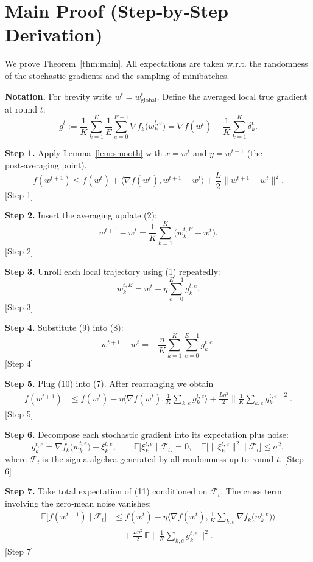 \documentclass{article}
\begin{document}
\section*{Main Proof (Step‑by‑Step Derivation)}
We prove Theorem~\ref{thm:main}. All expectations are taken w.r.t. the randomness of the stochastic gradients and the sampling of minibatches.  

\noindent\textbf{Notation.} For brevity write \(w^{t}=w^{t}_{\text{global}}\). Define the averaged local true gradient at round \(t\):
\[
\bar g^{t}:=\frac1K\sum_{k=1}^{K}\frac1E\sum_{e=0}^{E-1}\nabla f_k\!\big(w_{k}^{t,e}\big)
      =\nabla f(w^{t})+\frac1K\sum_{k=1}^{K}\delta_{k}^{t}. \tag{6}
\]

\noindent\textbf{Step 1.} Apply Lemma~\ref{lem:smooth} with \(x=w^{t}\) and \(y=w^{t+1}\) (the post‑averaging point).  
\[
f(w^{t+1})\le f(w^{t})+\langle\nabla f(w^{t}),w^{t+1}-w^{t}\rangle+\frac{L}{2}\|w^{t+1}-w^{t}\|^{2}. \tag{7}
\] \hfill [Step 1]

\noindent\textbf{Step 2.} Insert the averaging update (2):
\[
w^{t+1}-w^{t}= \frac1K\sum_{k=1}^{K}\big(w_{k}^{t,E}-w^{t}\big). \tag{8}
\] \hfill [Step 2]

\noindent\textbf{Step 3.} Unroll each local trajectory using (1) repeatedly:
\[
w_{k}^{t,E}= w^{t}-\eta\sum_{e=0}^{E-1} g_{k}^{t,e}. \tag{9}
\] \hfill [Step 3]

\noindent\textbf{Step 4.} Substitute (9) into (8):
\[
w^{t+1}-w^{t}= -\frac{\eta}{K}\sum_{k=1}^{K}\sum_{e=0}^{E-1} g_{k}^{t,e}. \tag{10}
\] \hfill [Step 4]

\noindent\textbf{Step 5.} Plug (10) into (7). After rearranging we obtain
\[
\begin{aligned}
f(w^{t+1})
&\le f(w^{t})
   -\eta\Big\langle\nabla f(w^{t}),\frac1K\sum_{k,e} g_{k}^{t,e}\Big\rangle
   +\frac{L\eta^{2}}{2}\Big\|\frac1K\sum_{k,e} g_{k}^{t,e}\Big\|^{2}.
\end{aligned}
\tag{11}
\] \hfill [Step 5]

\noindent\textbf{Step 6.} Decompose each stochastic gradient into its expectation plus noise:
\[
g_{k}^{t,e}= \nabla f_k\!\big(w_{k}^{t,e}\big)+\xi_{k}^{t,e},
\qquad 
\mathbb{E}\big[\xi_{k}^{t,e}\mid\mathcal{F}_{t}\big]=0,
\quad
\mathbb{E}\big[\|\xi_{k}^{t,e}\|^{2}\mid\mathcal{F}_{t}\big]\le\sigma^{2},
\] 
where \(\mathcal{F}_{t}\) is the sigma‑algebra generated by all randomness up to round \(t\). \hfill [Step 6]

\noindent\textbf{Step 7.} Take total expectation of (11) conditioned on \(\mathcal{F}_{t}\). The cross term involving the zero‑mean noise vanishes:
\[
\begin{aligned}
\mathbb{E}\!\big[f(w^{t+1})\mid\mathcal{F}_{t}\big]
&\le f(w^{t})
   -\eta\Big\langle\nabla f(w^{t}),\frac1K\sum_{k,e}\nabla f_k\!\big(w_{k}^{t,e}\big)\Big\rangle  \\
&\quad +\frac{L\eta^{2}}{2}\,
   \mathbb{E}\!\Big\|\frac1K\sum_{k,e} g_{k}^{t,e}\Big\|^{2}\! .
\end{aligned}
\tag{12}
\] \hfill [Step 7]
\end{document}
